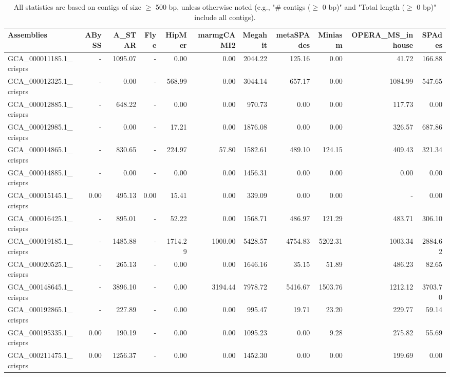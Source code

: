 \documentclass[12pt,a4paper]{article}
\begin{document}
\begin{table}[ht]
\begin{center}
\caption{All statistics are based on contigs of size $\geq$ 500 bp, unless otherwise noted (e.g., "\# contigs ($\geq$ 0 bp)" and "Total length ($\geq$ 0 bp)" include all contigs).}
\begin{tabular}{|l*{10}{|r}|}
\hline
Assemblies & ABySS & A\_STAR & Flye & HipMer & marmgCAMI2 & Megahit & metaSPAdes & Miniasm & OPERA\_MS\_inhouse & SPAdes \\ \hline
GCA\_000011185.1\_crisprs & - & 1095.07 & - & 0.00 & 0.00 & 2044.22 & 125.16 & 0.00 & 41.72 & 166.88 \\ \hline
GCA\_000012325.1\_crisprs & - & 0.00 & - & 568.99 & 0.00 & 3044.14 & 657.17 & 0.00 & 1084.99 & 547.65 \\ \hline
GCA\_000012885.1\_crisprs & - & 648.22 & - & 0.00 & 0.00 & 970.73 & 0.00 & 0.00 & 117.73 & 0.00 \\ \hline
GCA\_000012985.1\_crisprs & - & 0.00 & - & 17.21 & 0.00 & 1876.08 & 0.00 & 0.00 & 326.57 & 687.86 \\ \hline
GCA\_000014865.1\_crisprs & - & 830.65 & - & 224.97 & 57.80 & 1582.61 & 489.10 & 124.15 & 409.43 & 321.34 \\ \hline
GCA\_000014885.1\_crisprs & - & 0.00 & - & 0.00 & 0.00 & 1456.31 & 0.00 & 0.00 & 0.00 & 0.00 \\ \hline
GCA\_000015145.1\_crisprs & 0.00 & 495.13 & 0.00 & 15.41 & 0.00 & 339.09 & 0.00 & 0.00 & - & 0.00 \\ \hline
GCA\_000016425.1\_crisprs & - & 895.01 & - & 52.22 & 0.00 & 1568.71 & 486.97 & 121.29 & 483.71 & 306.10 \\ \hline
GCA\_000019185.1\_crisprs & - & 1485.88 & - & 1714.29 & 1000.00 & 5428.57 & 4754.83 & 5202.31 & 1003.34 & 2884.62 \\ \hline
GCA\_000020525.1\_crisprs & - & 265.13 & - & 0.00 & 0.00 & 1646.16 & 35.15 & 51.89 & 486.23 & 82.65 \\ \hline
GCA\_000148645.1\_crisprs & - & 3896.10 & - & 0.00 & 3194.44 & 7978.72 & 5416.67 & 1503.76 & 1212.12 & 3703.70 \\ \hline
GCA\_000192865.1\_crisprs & - & 227.89 & - & 0.00 & 0.00 & 995.47 & 19.71 & 23.20 & 229.77 & 59.14 \\ \hline
GCA\_000195335.1\_crisprs & 0.00 & 190.19 & - & 0.00 & 0.00 & 1095.23 & 0.00 & 9.28 & 275.82 & 55.69 \\ \hline
GCA\_000211475.1\_crisprs & 0.00 & 1256.37 & - & 0.00 & 0.00 & 1452.30 & 0.00 & 0.00 & 199.69 & 0.00 \\ \hline

\end{tabular}
\end{center}
\end{table}
\end{document}
